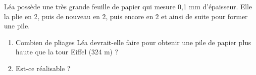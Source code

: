 \documentclass[exercice]{thedocument}%
\begin{document}
%
\begin{flushleft}
    Léa possède une très grande feuille de papier qui mesure 0,1 mm
    d'épaisseur. Elle la plie en 2, puis de nouveau en 2, puis encore
    en 2 et ainsi de suite pour former une pile.
\end{flushleft}
\begin{enumerate}
    \item Combien de pliages Léa devrait-elle faire pour obtenir une pile
    de papier plus haute que la tour Eiffel (324 m) ?
    \item Est-ce réalisable ?
\end{enumerate}
\begin{center}
\end{center}
\end{document}

